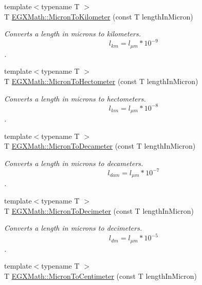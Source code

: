 \begin{DoxyCompactItemize}
{\footnotesize template$<$typename T $>$ }\\T \mbox{\hyperlink{group___e_g_x_math-_conversions-_length_conversions-_non-_s_i-_micron-_s_i_ga32266166f54e31b9dde1c47155dcb4ad}{E\+G\+X\+Math\+::\+Micron\+To\+Kilometer}} (const T length\+In\+Micron)
\begin{DoxyCompactList}\small\item\em Converts a length in microns to kilometers. \[ l_{km}=l_{\mu m} * 10^{-9} \]. \end{DoxyCompactList}\item 
{\footnotesize template$<$typename T $>$ }\\T \mbox{\hyperlink{group___e_g_x_math-_conversions-_length_conversions-_non-_s_i-_micron-_s_i_gae1509e20f2617b926b3a0f2fef2e4d0a}{E\+G\+X\+Math\+::\+Micron\+To\+Hectometer}} (const T length\+In\+Micron)
\begin{DoxyCompactList}\small\item\em Converts a length in microns to hectometers. \[ l_{hm}=l_{\mu m} * 10^{-8} \]. \end{DoxyCompactList}\item 
{\footnotesize template$<$typename T $>$ }\\T \mbox{\hyperlink{group___e_g_x_math-_conversions-_length_conversions-_non-_s_i-_micron-_s_i_gab41e5d3a8f679f0e476fbd7bf2c6dcc7}{E\+G\+X\+Math\+::\+Micron\+To\+Decameter}} (const T length\+In\+Micron)
\begin{DoxyCompactList}\small\item\em Converts a length in microns to decameters. \[ l_{dam}=l_{\mu m} * 10^{-7} \]. \end{DoxyCompactList}\item 
{\footnotesize template$<$typename T $>$ }\\T \mbox{\hyperlink{group___e_g_x_math-_conversions-_length_conversions-_non-_s_i-_micron-_s_i_gaac80fa1efc245cc204395a3a2771c2be}{E\+G\+X\+Math\+::\+Micron\+To\+Decimeter}} (const T length\+In\+Micron)
\begin{DoxyCompactList}\small\item\em Converts a length in microns to decimeters. \[ l_{dm}=l_{\mu m} * 10^{-5} \]. \end{DoxyCompactList}\item 
{\footnotesize template$<$typename T $>$ }\\T \mbox{\hyperlink{group___e_g_x_math-_conversions-_length_conversions-_non-_s_i-_micron-_s_i_gac987114703e1d7672646b3835f56d78b}{E\+G\+X\+Math\+::\+Micron\+To\+Centimeter}} (const T length\+In\+Micron)

\end{DoxyCompactItemize}
